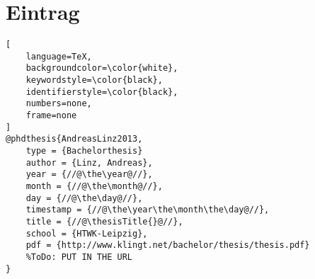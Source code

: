 \chapter*{\BibTeX{} Eintrag}

\begin{lstlisting}[
	language=TeX,
	backgroundcolor=\color{white},
	keywordstyle=\color{black},
	identifierstyle=\color{black},
	numbers=none,
	frame=none
]
@phdthesis{AndreasLinz2013,
	type = {Bachelorthesis}
	author = {Linz, Andreas},
	year = {//@\the\year@//},
	month = {//@\the\month@//},
	day = {//@\the\day@//},
	timestamp = {//@\the\year\the\month\the\day@//},
	title = {//@\thesisTitle{}@//},
	school = {HTWK-Leipzig},
	pdf = {http://www.klingt.net/bachelor/thesis/thesis.pdf}
	%ToDo: PUT IN THE URL
}
\end{lstlisting}
